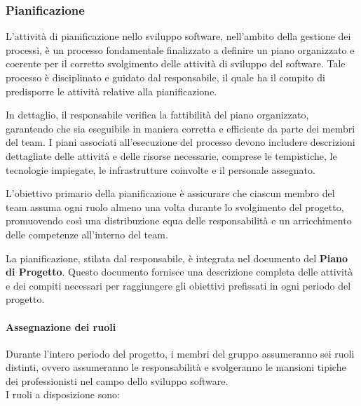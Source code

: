 \documentclass{article}
\begin{document}
\subsubsection{Pianificazione}

L'attività di pianificazione nello sviluppo software, nell'ambito della gestione dei processi, è un processo fondamentale finalizzato a definire un piano organizzato e coerente per il corretto svolgimento delle attività di sviluppo del software. Tale processo è disciplinato e guidato dal responsabile, il quale ha il compito di predisporre le attività relative alla pianificazione.

\vspace{0,1cm}

In dettaglio, il responsabile verifica la fattibilità del piano organizzato, garantendo che sia eseguibile in maniera corretta e efficiente da parte dei membri del team. I piani associati all'esecuzione del processo devono includere descrizioni dettagliate delle attività e delle risorse necessarie, comprese le tempistiche, le tecnologie impiegate, le infrastrutture coinvolte e il personale assegnato.

\vspace{0,1cm}

L'obiettivo primario della pianificazione è assicurare che ciascun membro del team assuma ogni ruolo almeno una volta durante lo svolgimento del progetto, promuovendo così una distribuzione equa delle responsabilità e un arricchimento delle competenze all'interno del team.

\vspace{0,1cm}

La pianificazione, stilata dal responsabile, è integrata nel documento del \textbf{Piano di Progetto}. Questo documento fornisce una descrizione completa delle attività e dei compiti necessari per raggiungere gli obiettivi prefissati in ogni periodo del progetto.
\paragraph{Assegnazione dei ruoli}

Durante l'intero periodo del progetto, i membri del gruppo assumeranno sei ruoli distinti, ovvero assumeranno le responsabilità e svolgeranno le mansioni tipiche dei professionisti nel campo dello sviluppo software.
\\I ruoli a disposizione sono:
\end{document}
